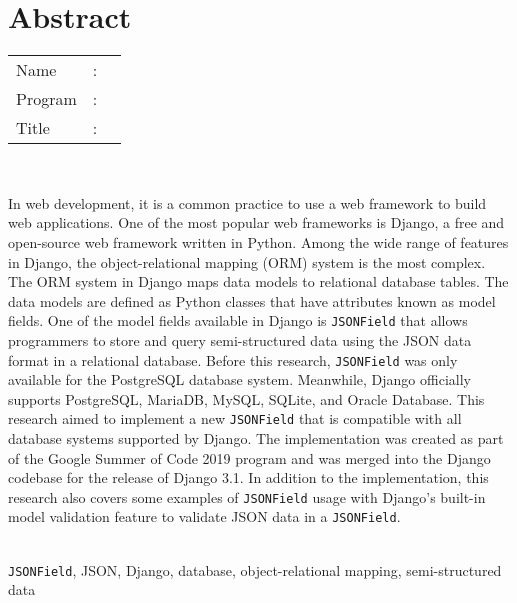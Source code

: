 %
%
%

\chapter*{Abstract}
\singlespacing

\vspace*{0.2cm}

\noindent \begin{tabular}{@{}l l p{12.0cm}}
	Name&: & \penulis \\
	Program&: & \program \\
	Title&: & \judulInggris \\
\end{tabular} \\

\vspace*{0.5cm}

\noindent
In web development, it is a common practice to use a web framework to build web
applications. One of the most popular web frameworks is Django, a free and
open-source web framework written in Python. Among the wide range of features
in Django, the object-relational mapping (ORM) system is the most complex. The
ORM system in Django maps data models to relational database tables. The data
models are defined as Python classes that have attributes known as model
fields. One of the model fields available in Django is \verb|JSONField| that
allows programmers to store and query semi-structured data using the JSON data
format in a relational database. Before this research, \verb|JSONField| was
only available for the PostgreSQL database system. Meanwhile, Django officially
supports PostgreSQL, MariaDB, MySQL, SQLite, and Oracle Database. This research
aimed to implement a new \verb|JSONField| that is compatible with all database
systems supported by Django. The implementation was created as part of the
Google Summer of Code 2019 program and was merged into the Django codebase for
the release of Django 3.1. In addition to the implementation, this research
also covers some examples of \verb|JSONField| usage with Django's built-in
model validation feature to validate JSON data in a \verb|JSONField|.\\

\vspace*{0.2cm}

\noindent {} \\
\verb|JSONField|, JSON, Django, database, object-relational mapping,
semi-structured data \\

\onehalfspacing
\newpage
